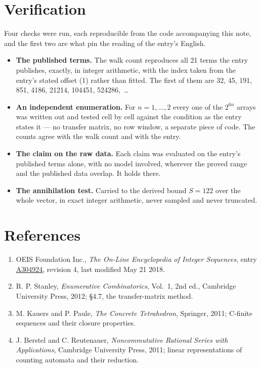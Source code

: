 \documentclass[11pt]{article}
\theoremstyle{definition}
\begin{document}
\section{Verification}

Four checks were run, each reproducible from the code accompanying this note, and the first two are what pin the reading of the entry's English.

\begin{itemize}

\item {\bfseries The published terms.} The walk count reproduces all 21 terms the entry publishes, exactly, in integer arithmetic, with the index taken from the entry's stated offset (1) rather than fitted. The first of them are 32, 45, 191, 851, 4186, 21214, 104451, 524286,~\dots

\item {\bfseries An independent enumeration.} For $n = 1,\dots,2$ every one of the $2^{6n}$ arrays was written out and tested cell by cell against the condition as the entry states it --- no transfer matrix, no row window, a separate piece of code. The counts agree with the walk count and with the entry.

\item {\bfseries The claim on the raw data.} Each claim was evaluated on the entry's published terms alone, with no model involved, wherever the proved range and the published data overlap. It holds there.

\item {\bfseries The annihilation test.} Carried to the derived bound $S = 122$ over the whole vector, in exact integer arithmetic, never sampled and never truncated.

\end{itemize}

\section{References}

\begin{enumerate}

\item OEIS Foundation Inc., \emph{The On-Line Encyclopedia of Integer Sequences}, entry \href{https://oeis.org/A304924}{A304924}, revision 4, last modified May 21 2018.

\item R. P. Stanley, \emph{Enumerative Combinatorics}, Vol.~1, 2nd ed., Cambridge University Press, 2012; \S4.7, the transfer-matrix method.

\item M. Kauers and P. Paule, \emph{The Concrete Tetrahedron}, Springer, 2011; C-finite sequences and their closure properties.

\item J. Berstel and C. Reutenauer, \emph{Noncommutative Rational Series with Applications}, Cambridge University Press, 2011; linear representations of counting automata and their reduction.

\end{enumerate}
\end{document}
